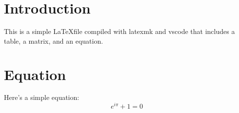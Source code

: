 \documentclass{article}
\begin{document}
\section{Introduction}

This is a simple \LaTeX file compiled with latexmk and vscode
that includes a table, a matrix, and an equation.


\section{Equation}

Here's a simple equation:
\[
  e^{i\pi} + 1 = 0
\]
\end{document}
